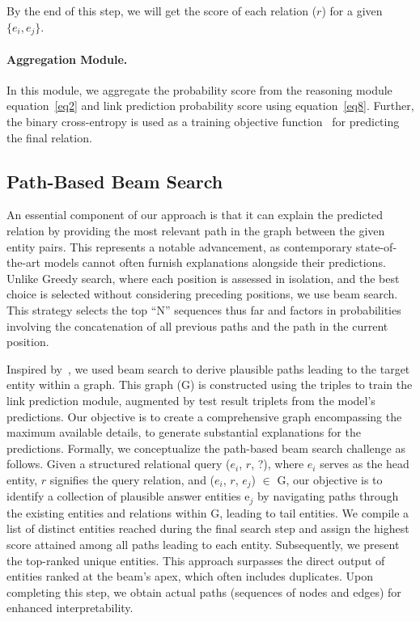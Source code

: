\documentclass[letterpaper]{article} %
\begin{document}
By the end of this step, we will get the score of each relation ($r$) for a given $\{e_i,e_j\}$.


\paragraph{\textbf{Aggregation Module.}} In this module, we aggregate the probability score from the reasoning module equation~\ref{eq2} and link prediction probability score using equation~\ref{eq8}. Further, the binary cross-entropy is used as a training objective function~\cite{yao-etal-2019-docred} for predicting the final relation.

\subsection{Path-Based Beam Search}
An essential component of our approach is that it can explain the predicted relation by providing the most relevant path in the graph between the given entity pairs. This represents a notable advancement, as contemporary state-of-the-art models cannot often furnish explanations alongside their predictions. Unlike Greedy search, where each position is assessed in isolation, and the best choice is selected without considering preceding positions, we use beam search. This strategy selects the top \enquote{N} sequences thus far and factors in probabilities involving the concatenation of all previous paths and the path in the current position.

Inspired by~\cite{10.1145/3514221.3517887}, we used beam search to derive plausible paths leading to the target entity within a graph. This graph (G) is constructed using the triples to train the link prediction module, augmented by test result triplets from the model's predictions. Our objective is to create a comprehensive graph encompassing the maximum available details, to generate substantial explanations for the predictions.
Formally, we conceptualize the path-based beam search challenge as follows. Given a structured relational query ($e_i$, $r$, ?), where $e_i$ serves as the head entity, $r$ signifies the query relation, and ($e_i$, $r$, $e_j$) $\in$ G, our objective is to identify a collection of plausible answer entities {e$_j$} by navigating paths through the existing entities and relations within G, leading to tail entities. We compile a list of distinct entities reached during the final search step and assign the highest score attained among all paths leading to each entity. Subsequently, we present the top-ranked unique entities. This approach surpasses the direct output of entities ranked at the beam's apex, which often includes duplicates. Upon completing this step, we obtain actual paths (sequences of nodes and edges) for enhanced interpretability.
\end{document}
